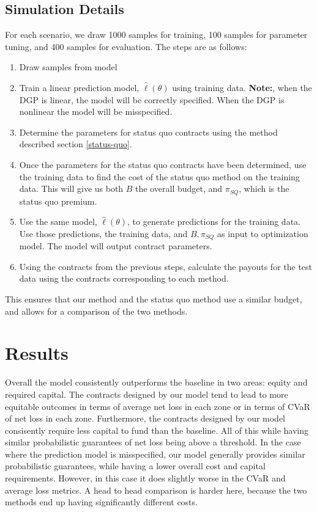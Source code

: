 \documentclass[11pt]{article}
\begin{document}
   \subsection{Simulation Details}
   For each scenario, we draw 1000 samples for training, 100 samples for parameter tuning, and 400 samples for evaluation. The steps are as follows: 
   \begin{enumerate}
       \item Draw samples from model
       \item Train a linear prediction model, $\hat{\ell}(\theta)$ using training data. \textbf{Note:}, when the DGP is linear, the model will be correctly specified. When the DGP is nonlinear the model will be misspecified.
       \item Determine the parameters for status quo contracts using the method described section \ref{status-quo}. 
       \item Once the parameters for the status quo contracts have been determined, use the training data to find the cost of the status quo method on the training data. This will give us both $B$ the overall budget, and $\pi_{SQ}$, which is the status quo premium. 
       \item Use the same model, $\hat{\ell}(\theta)$, to generate predictions for the training data. Use those predictions, the training data, and $B,\pi_{SQ}$ as input to optimization model. The model will output contract parameters. 
       \item Using the contracts from the previous steps, calculate the payouts for the test data using the contracts corresponding to each method. 
   \end{enumerate}

   This ensures that our method and the status quo method use a similar budget, and allows for a comparison of the two methods. 

\section{Results}
  Overall the model consistently outperforms the baseline in two areas: equity and required capital. The contracts designed by our model tend to lead to more equitable outcomes in terms of average net loss in each zone or in terms of CVaR of net loss in each zone. Furthermore, the contracts designed by our model consisently require less capital to fund than the baseline. All of this while having similar probabilistic guarantees of net loss being above a threshold. In the case where the prediction model is misspecified, our model generally provides similar probabilistic guarantees, while having a lower overall cost and capital requirements. However, in this case it does slightly worse in the CVaR and average loss metrics. A head to head comparison is harder here, because the two methods end up having significantly different costs. 
\end{document}
